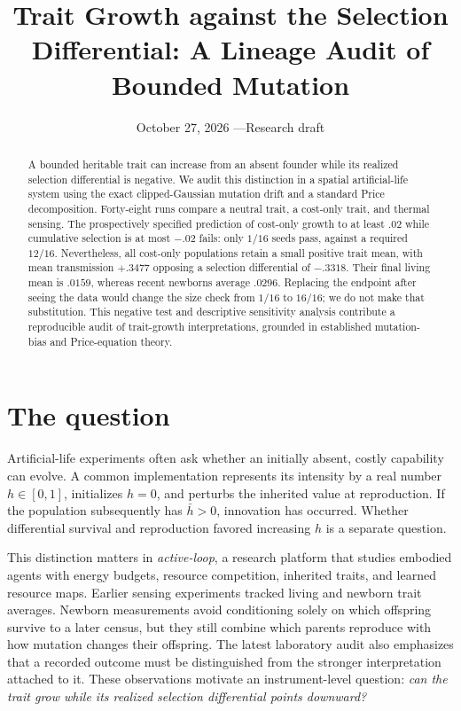 \documentclass[10pt]{article}
\title{Trait Growth against the Selection Differential: A Lineage Audit of Bounded Mutation}
\author{}
\date{October 27, 2026 \quad---\quad Research draft}
\begin{document}
\maketitle
\vspace{-1.7em}
\begin{abstract}
A bounded heritable trait can increase from an absent founder while its realized selection differential is negative. We audit this distinction in a spatial artificial-life system using the exact clipped-Gaussian mutation drift and a standard Price decomposition. Forty-eight runs compare a neutral trait, a cost-only trait, and thermal sensing. The prospectively specified prediction of cost-only growth to at least $.02$ while cumulative selection is at most $-.02$ fails: only $1/16$ seeds pass, against a required $12/16$. Nevertheless, all cost-only populations retain a small positive trait mean, with mean transmission $+.3477$ opposing a selection differential of $-.3318$. Their final living mean is $.0159$, whereas recent newborns average $.0296$. Replacing the endpoint after seeing the data would change the size check from $1/16$ to $16/16$; we do not make that substitution. This negative test and descriptive sensitivity analysis contribute a reproducible audit of trait-growth interpretations, grounded in established mutation-bias and Price-equation theory.
\end{abstract}

\section{The question}
Artificial-life experiments often ask whether an initially absent, costly capability can evolve. A common implementation represents its intensity by a real number $h\in[0,1]$, initializes $h=0$, and perturbs the inherited value at reproduction. If the population subsequently has $\bar h>0$, innovation has occurred. Whether differential survival and reproduction favored increasing $h$ is a separate question.

This distinction matters in \emph{active-loop}, a research platform that studies embodied agents with energy budgets, resource competition, inherited traits, and learned resource maps. Earlier sensing experiments tracked living and newborn trait averages. Newborn measurements avoid conditioning solely on which offspring survive to a later census, but they still combine which parents reproduce with how mutation changes their offspring. The latest laboratory audit also emphasizes that a recorded outcome must be distinguished from the stronger interpretation attached to it. These observations motivate an instrument-level question: \emph{can the trait grow while its realized selection differential points downward?}
\end{document}
